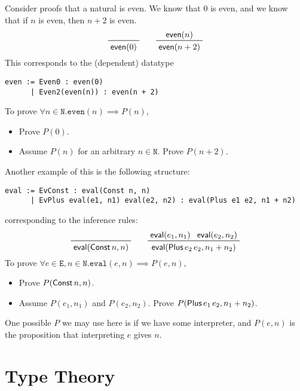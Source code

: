 \documentclass[class=scrartcl]{standalone}
\begin{document}
Consider proofs that a natural is even.
We know that \(0\) is even, and
we know that if \(n\) is even, then \(n+2\) is even.
\[
  \prfaxiom{\lcalcname{even}(0)}
  \qquad
  \prftree{\lcalcname{even}(n)}
          {\lcalcname{even}(n + 2)}
\]
This corresponds to the (dependent) datatype
\begin{verbatim}
even := Even0 : even(0)
      | Even2(even(n)) : even(n + 2)
\end{verbatim}
To prove \(\forall n \in \texttt{N}. \texttt{even}(n) \implies P(n)\),
\begin{itemize}[nosep]
  \item Prove \(P(0)\).
  \item Assume \(P(n)\) for an arbitrary \(n \in \texttt{N}\).
        Prove \(P(n + 2)\).
\end{itemize}

Another example of this is the following structure:
\begin{verbatim}
eval := EvConst : eval(Const n, n)
      | EvPlus eval(e1, n1) eval(e2, n2) : eval(Plus e1 e2, n1 + n2)
\end{verbatim}
corresponding to the inference rules:
\[
  \prfaxiom{\lcalcname{eval}(\lcalcname{Const} n, n)}
  \qquad
  \prftree{\lcalcname{eval}(e_1, n_1)}
          {\lcalcname{eval}(e_2, n_2)}
          {\lcalcname{eval}(\lcalcname{Plus} e_2\, e_2, n_1 + n_2)}
\]
To prove \(\forall e \in \texttt{E}, n \in \texttt{N}.
           \texttt{eval}(e, n) \implies P(e, n)\),
\begin{itemize}[nosep]
  \item Prove \(P(\operatorname{\textsf{Const}} n, n)\).
  \item Assume \(P(e_1, n_1)\) and \(P(e_2, n_2)\).
        Prove \(P(\operatorname{\textsf{Plus}} e_1\, e_2, n_1 + n_2)\).
\end{itemize}
One possible \(P\) we may use here is if we have some interpreter,
and \(P(e, n)\) is the proposition that interpreting \(e\) gives \(n\).


\chapter{Type Theory}
\end{document}

